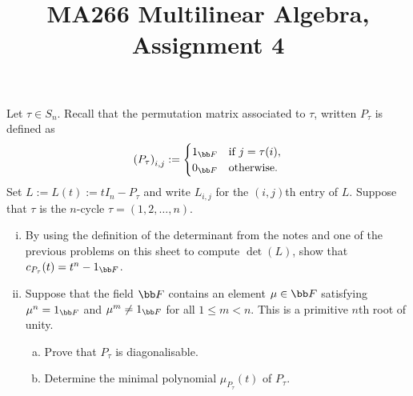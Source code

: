 \documentclass[a4paper]{article}
\title{MA266 Multilinear Algebra, Assignment 4}
\begin{document}
\maketitle

\setlength{\parindent}{0em}
\setlength{\parskip}{1em}


\begin{questionbody}
Let $\tau \in S_n$. Recall that the permutation matrix associated to $\tau$, written $P_\tau$ is defined as \[
{(P_\tau)}_{i, j} := \begin{cases}
1_{\bb F} & \text{if } j = \tau(i), \\
0_{\bb F} & \text{otherwise}.
\end{cases}
\] Set $L := L(t) := t I_n - P_\tau$ and write $L_{i, j}$ for the $(i, j)$th entry of $L$. Suppose that $\tau$ is the $n$-cycle $\tau = (1, 2, \dotsc, n)$.
\begin{enumerate}[(i)]
\item By using the definition of the determinant from the notes and one of the previous problems on this sheet to compute $\det(L)$, show that $c_{P_\tau}(t) = t^n - 1_{\bb F}$.

\item Suppose that the field $\bb F$ contains an element $\mu \in \bb F$ satisfying $\mu^n = 1_{\bb F}$ and $\mu^m \ne 1_{\bb F}$ for all $1 \le m < n$. This is a primitive $n$th root of unity.
\begin{enumerate}[(a)]
\item Prove that $P_\tau$ is diagonalisable.

\item Determine the minimal polynomial $\mu_{P_\tau}(t)$ of $P_\tau$.
\end{enumerate}
\end{enumerate}
\end{questionbody}

\subsection{~} %
\end{document}
